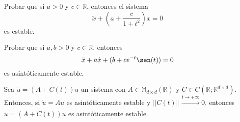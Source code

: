 \begin{ejm}
  Probar que si $a > 0$ y $c \in \mathbb{R}$, entonces el sistema
  \[ 
    \ddot{x} + (a + \frac{c}{1 + t^{2}})x = 0
  \]
  es estable.
\end{ejm}
%

\begin{ejm}
  Probar que si $a, b > 0$ y $c \in \mathbb{R}$, entonces 
  \[ 
    \ddot{x} + a \dot{x} + (b + c e^{-t} \sen(t)) = 0
  \] 
  es asintóticamente estable.
\end{ejm}

\begin{theo}
  Sea $\dot{u} = (A + C(t))u$ un sistema con $A \in \mathbb{M}_{d \times d} (\mathbb{R})$ y $ C \in C(\mathbb{R}; \mathbb{R}^{d \times d})$. Entonces, si $\dot{u} = A u$ es asintóticamente estable y $||C(t)|| \xrightarrow[]{ t \rightarrow +\infty } 0$, entonces $\dot{u} = ( A + C(t)) u$ es asintóticamente estable.
\end{theo}

